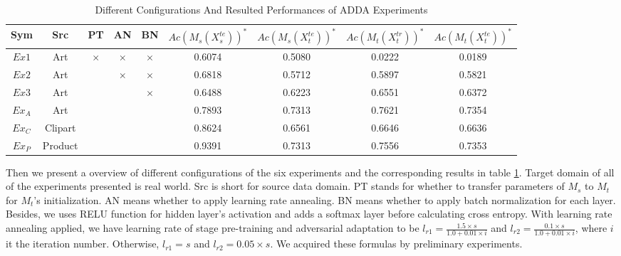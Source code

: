\documentclass[conference]{IEEEtran}
\begin{document}
 \begin{table}[h]
	\centering
	\caption{Different Configurations And Resulted Performances of ADDA Experiments}
	\label{tab:ConfigADDA}
	\begin{tabular}{ccccccccc}
		\hline
		Sym & Src & PT & AN & BN & $Ac(M_s(X^{te}_s))^*$ & $Ac(M_s(X^{te}_t))^*$ & $Ac(M_t(X^{tr}_t))^*$ & $Ac(M_t(X^{te}_t))^*$\\
		\hline
		\hline
        $Ex1$ & Art & $\times$ & $\times$ & $\times$ & 0.6074 & 0.5080 & 0.0222 & 0.0189 \\
		$Ex2$ &  Art & \checkmark & $\times$ & $\times$ & 0.6818 & 0.5712 & 0.5897 & 0.5821 \\
		$Ex3$ &  Art & \checkmark & \checkmark & $\times$ & 0.6488 & 0.6223 & 0.6551 & 0.6372\\
		$Ex_A$ &  Art & \checkmark & \checkmark & \checkmark & 0.7893 & 0.7313 & 0.7621 & 0.7354\\
		$Ex_C$ &  Clipart & \checkmark & \checkmark & \checkmark & 0.8624 & 0.6561 & 0.6646 & 0.6636\\
		$Ex_P$ &  Product & \checkmark & \checkmark & \checkmark & 0.9391 & 0.7313 & 0.7556 & 0.7353\\
		\hline
	\end{tabular}
\end{table}
Then we present a overview of different configurations of the six experiments and the corresponding results in table \ref{tab:ConfigADDA}. Target domain of all of the experiments presented is real world. Src is short for source data domain. PT stands for whether to transfer parameters of $M_s$ to $M_t$ for $M_t$'s initialization. AN means whether to apply learning rate annealing. BN means whether to apply batch normalization for each layer. Besides, we uses RELU function for hidden layer's activation and adds a softmax layer before calculating cross entropy. With learning rate annealing applied, we have learning rate of stage pre-training and adversarial adaptation to be $l_{r1}=\frac{1.5 \times s}{1.0 + 0.01 \times i}$ and $l_{r2}=\frac{0.1 \times s}{1.0 + 0.01 \times i}$, where $i$ it the iteration number. Otherwise, $l_{r1}=s$ and $l_{r2}=0.05 \times s$. We acquired these formulas by preliminary experiments.
\end{document}
